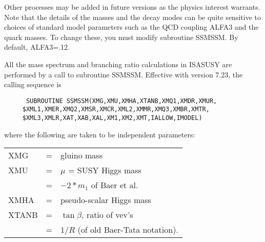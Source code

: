 Other processes may be added in future versions as the physics 
interest warrants. Note that
the details of the masses and the decay modes can be quite sensitive
to choices of standard model parameters such as the QCD coupling ALFA3
and the quark masses.  To change these, you must modify subroutine
SSMSSM. By default, ALFA3=.12.

      All the mass spectrum and branching ratio calculations in ISASUSY 
are performed by a call to subroutine SSMSSM. Effective with version 7.23,
the calling sequence is
\begin{verbatim}
      SUBROUTINE SSMSSM(XMG,XMU,XMHA,XTANB,XMQ1,XMDR,XMUR,
     $XML1,XMER,XMQ2,XMSR,XMCR,XML2,XMMR,XMQ3,XMBR,XMTR,
     $XML3,XMLR,XAT,XAB,XAL,XM1,XM2,XMT,IALLOW,IMODEL)
\end{verbatim}
where the following are taken to be independent parameters:

\smallskip\noindent
\begin{tabular}{lcl}
      XMG    &=& gluino mass\\
      XMU    &=& $\mu$ = SUSY Higgs mass\\
             &=& $-2*m_1$ of Baer et al.\\
      XMHA   &=& pseudo-scalar Higgs mass\\
      XTANB  &=& $\tan\beta$, ratio of vev's\\
             &=& $1/R$ (of old Baer-Tata notation).\\
\end{tabular}

